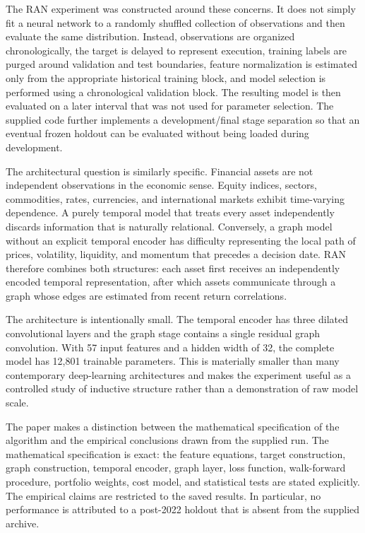 \documentclass[10pt]{article}
\begin{document}
The RAN experiment was constructed around these concerns. It does not simply fit a neural network to a randomly shuffled collection of observations and then evaluate the same distribution. Instead, observations are organized chronologically, the target is delayed to represent execution, training labels are purged around validation and test boundaries, feature normalization is estimated only from the appropriate historical training block, and model selection is performed using a chronological validation block. The resulting model is then evaluated on a later interval that was not used for parameter selection. The supplied code further implements a development/final stage separation so that an eventual frozen holdout can be evaluated without being loaded during development.

The architectural question is similarly specific. Financial assets are not independent observations in the economic sense. Equity indices, sectors, commodities, rates, currencies, and international markets exhibit time-varying dependence. A purely temporal model that treats every asset independently discards information that is naturally relational. Conversely, a graph model without an explicit temporal encoder has difficulty representing the local path of prices, volatility, liquidity, and momentum that precedes a decision date. RAN therefore combines both structures: each asset first receives an independently encoded temporal representation, after which assets communicate through a graph whose edges are estimated from recent return correlations.

The architecture is intentionally small. The temporal encoder has three dilated convolutional layers and the graph stage contains a single residual graph convolution. With 57 input features and a hidden width of 32, the complete model has 12,801 trainable parameters. This is materially smaller than many contemporary deep-learning architectures and makes the experiment useful as a controlled study of inductive structure rather than a demonstration of raw model scale.

The paper makes a distinction between the mathematical specification of the algorithm and the empirical conclusions drawn from the supplied run. The mathematical specification is exact: the feature equations, target construction, graph construction, temporal encoder, graph layer, loss function, walk-forward procedure, portfolio weights, cost model, and statistical tests are stated explicitly. The empirical claims are restricted to the saved results. In particular, no performance is attributed to a post-2022 holdout that is absent from the supplied archive.
\end{document}
